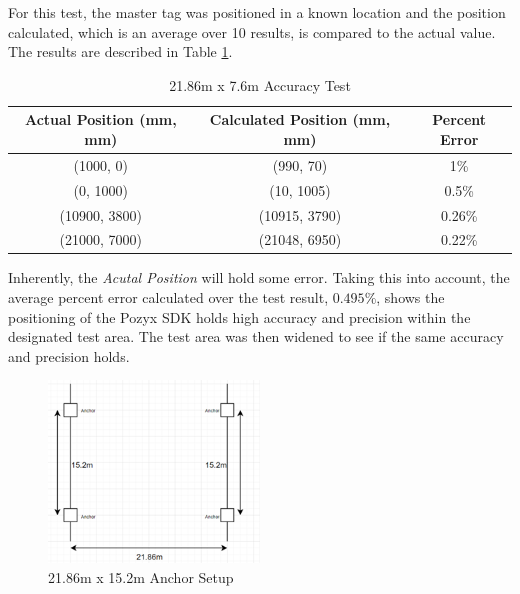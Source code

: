 \documentclass[12pt, a4paper]{article}
\begin{document}
For this test, the master tag was positioned in a known location and the position calculated, which is an
average over 10 results, is compared to the actual value. 
The results are described in Table \ref{tab:res1}.
\begin{center}
    \begin{table}[h]
        \begin{adjustbox}{width=1\textwidth, center=\textwidth}
            \small
            \begin{tabular}{||c c c||}
                \hline
                Actual Position (mm, mm) & Calculated Position (mm, mm) & Percent Error \\
                \hline
                (1000, 0) & (990, 70) & 1\% \\
                \hline
                (0, 1000) & (10, 1005) & 0.5\% \\
                \hline
                (10900, 3800) & (10915, 3790) & 0.26\% \\
                \hline
                (21000, 7000) & (21048, 6950) & 0.22\% \\
                \hline
            \end{tabular}
        \end{adjustbox}
        \caption{21.86m x 7.6m Accuracy Test}
        \label{tab:res1}
    \end{table}
\end{center}
Inherently, the \textit{Acutal Position} will hold some error. Taking this into account, the average percent error calculated over the test result,
$0.495\%$, shows the positioning of the Pozyx SDK holds high accuracy and precision within the designated test area.
The test area was then widened to see if the same accuracy and precision holds.
\begin{figure}[H]
    \centering
    \includegraphics[width=0.5\textwidth]{setup2.png}
    \caption{21.86m x 15.2m Anchor Setup}
\end{figure}
\end{document}
